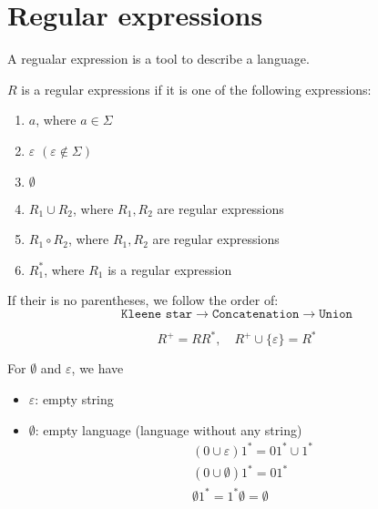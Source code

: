 
\section{Regular expressions}

A regualar expression is a tool to describe a language.

\begin{definition}
    $R$ is a regular expressions if it is one of the following expressions: 
    \begin{enumerate}[label=(\arabic*)]
        \item $a$, where $a \in \Sigma$
        \item $\varepsilon$ $(\varepsilon \notin \Sigma)$
        \item $\emptyset$
        \item $R_1 \cup R_2$,  where $R_1, R_2$ are regular expressions
        \item $R_1 \circ R_2$, where $R_1, R_2$ are regular expressions
        \item $R_1^*$,  where $R_1$ is a regular expression
    \end{enumerate}
\end{definition}

If their is no parentheses, we follow the order of:
\[
\boxed{\texttt{Kleene star}} \rightarrow \boxed{\texttt{Concatenation}} \rightarrow \boxed{\texttt{Union}}
\]

\newpage

\begin{remark}
    \[
        R^+ = RR^*, \quad R^+ \cup \{\varepsilon\} = R^*
    \]
\end{remark}

For $\emptyset$ and $\varepsilon$, we have 
\begin{itemize}
    \item $\varepsilon$: empty string
    \item $\emptyset$: empty language (language without any string)
    \begin{align*}
        &(0 \cup \varepsilon)1^*=01^* \cup 1^* \\
        &(0 \cup \emptyset)1^*=01^* \\
        &\emptyset 1^* = 1^* \emptyset = \emptyset
    \end{align*}
    
\end{itemize}



